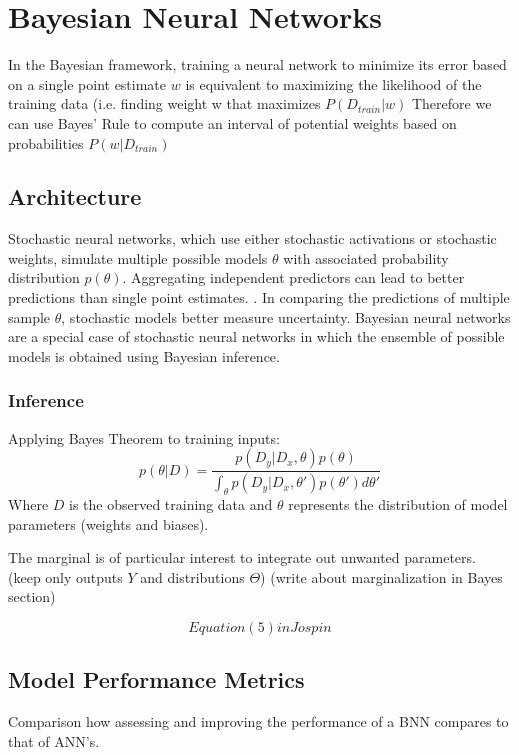 \chapter{Bayesian Neural Networks}

 In the Bayesian framework, training a neural network to minimize its error based on a single point estimate $w$ is equivalent to maximizing the likelihood of the training data (i.e. finding weight w that maximizes $P(D_{train}|w)$ \cite{bishop1995} Therefore we can use Bayes’ Rule to compute an interval of potential weights based on probabilities $P(w|D_{train})$

\section{Architecture}

Stochastic neural networks, which use either stochastic activations or stochastic weights, simulate multiple possible models $\theta$ with associated probability distribution $p(\theta)$.  Aggregating independent predictors can lead to better predictions than single point estimates. \cite{Jospin}.  In comparing the predictions of multiple sample $\theta$, stochastic models better measure uncertainty.  Bayesian neural networks are a special case of stochastic neural networks in which the ensemble of possible models is obtained using Bayesian inference. \cite{mackay1992practical}

\subsection{Inference}

Applying Bayes Theorem to training inputs:
$$
p(\theta|D) = \frac{p(D_{y}|D_{x},\theta)p(\theta)}{\int_\theta p(D_{y}|D_{x},\theta')p(\theta')d\theta'}
$$
Where $D$ is the observed training data and $\theta$ represents the distribution of model parameters (weights and biases).


The marginal is of particular interest to integrate out unwanted parameters.  (keep only outputs $Y$ and distributions $\Theta$)
(write about marginalization in Bayes section)

$$
Equation (5) in Jospin
$$


\section{Model Performance Metrics}

Comparison how assessing and improving the performance of a BNN compares to that of ANN's.






